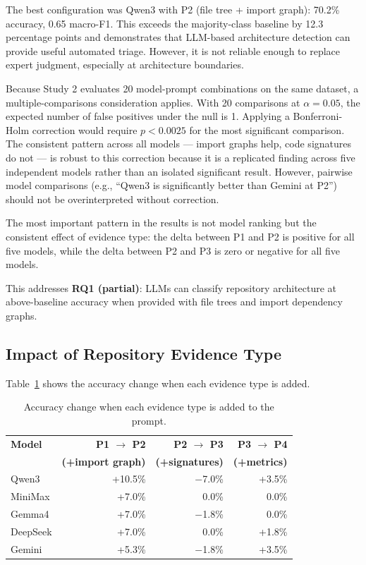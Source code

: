 The best configuration was Qwen3 with P2 (file tree + import graph): 70.2\% accuracy, 0.65 macro-F1. This exceeds the majority-class baseline by 12.3 percentage points and demonstrates that LLM-based architecture detection can provide useful automated triage. However, it is not reliable enough to replace expert judgment, especially at architecture boundaries.

Because Study 2 evaluates 20 model-prompt combinations on the same dataset, a multiple-comparisons consideration applies. With 20 comparisons at $\alpha = 0.05$, the expected number of false positives under the null is 1. Applying a Bonferroni-Holm correction would require $p < 0.0025$ for the most significant comparison. The consistent pattern across all models — import graphs help, code signatures do not — is robust to this correction because it is a replicated finding across five independent models rather than an isolated significant result. However, pairwise model comparisons (e.g., ``Qwen3 is significantly better than Gemini at P2'') should not be overinterpreted without correction.

The most important pattern in the results is not model ranking but the consistent effect of evidence type: the delta between P1 and P2 is positive for all five models, while the delta between P2 and P3 is zero or negative for all five models.

This addresses \textbf{RQ1 (partial)}: LLMs can classify repository architecture at above-baseline accuracy when provided with file trees and import dependency graphs.

\subsection{Impact of Repository Evidence Type}
\label{subsec:eval_evidence}

Table~\ref{tab:eval_evidence_delta} shows the accuracy change when each evidence type is added.

\begin{table}[H]
\centering
\small
\caption{Accuracy change when each evidence type is added to the prompt.}
\label{tab:eval_evidence_delta}
\begin{tabular}{lrrr}
\toprule
\textbf{Model} & \textbf{P1 $\to$ P2} & \textbf{P2 $\to$ P3} & \textbf{P3 $\to$ P4} \\
 & \textbf{(+import graph)} & \textbf{(+signatures)} & \textbf{(+metrics)} \\
\midrule
Qwen3    & +10.5\% & $-$7.0\% & +3.5\% \\
MiniMax  & +7.0\%  &  0.0\%  &  0.0\% \\
Gemma4   & +7.0\%  & $-$1.8\% &  0.0\% \\
DeepSeek & +7.0\%  &  0.0\%  & +1.8\% \\
Gemini   & +5.3\%  & $-$1.8\% & +3.5\% \\
\bottomrule
\end{tabular}
\end{table}


